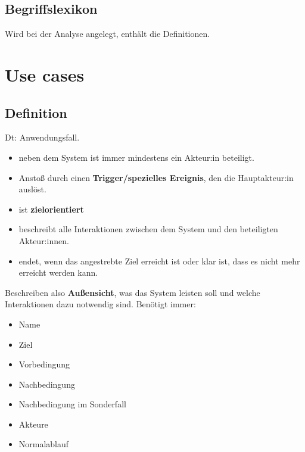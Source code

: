 \documentclass{book}
\begin{document}
    \subsection{Begriffslexikon}
    Wird bei der Analyse angelegt, enthält die Definitionen.

    \section{Use cases}
    \subsection{Definition}
    Dt: Anwendungsfall.
    \begin{itemize}
        \item neben dem System ist immer mindestens ein Akteur:in beteiligt.
        \item Anstoß durch einen \textbf{Trigger/spezielles Ereignis}, den die Hauptakteur:in auslöst.
        \item ist \textbf{zielorientiert}
        \item beschreibt alle Interaktionen zwischen dem System und den beteiligten Akteur:innen.
        \item endet, wenn das angestrebte Ziel erreicht ist oder klar ist, dass es nicht mehr erreicht werden kann.
    \end{itemize}
    Beschreiben also \textbf{Außensicht}, was das System leisten soll und welche Interaktionen dazu notwendig sind.
    Benötigt immer:
    \begin{itemize}
        \item Name
        \item Ziel
        \item Vorbedingung
        \item Nachbedingung
        \item Nachbedingung im Sonderfall
        \item Akteure
        \item Normalablauf
    \end{itemize}
\end{document}
